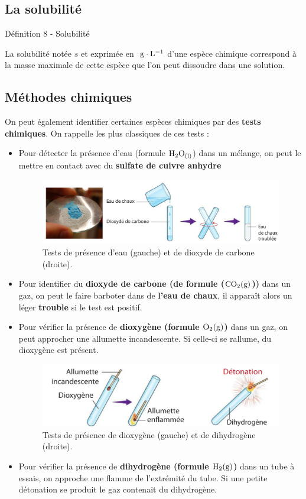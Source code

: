 \documentclass[french, a4paper, 12pt, twocolumn, landscape]{article}
\begin{document}
\subsection{La solubilité}

\begin{definition}{Définition 8 - Solubilité}
	\medskip

	La solubilité notée $s$ et exprimée en $~\rm g\cdot L^{-1}$ d'une espèce chimique correspond à la masse maximale de cette espèce que l'on peut dissoudre dans une solution.
\end{definition}
\clearpage


		\subsection{Méthodes chimiques}


		On peut également identifier certaines espèces chimiques par des \textbf{tests chimiques}. On rappelle les plus classiques de ces tests :

		\begin{itemize}
			\item Pour détecter la présence d'eau (formule $\rm H_2O_{(l)}$) dans un mélange, on peut le mettre en contact avec du \textbf{sulfate de cuivre anhydre}
			\begin{figure}[ht]
				\centering
				\includegraphics[width=.5\textwidth]{sulfatedecuivre.png}
				\caption{Tests de présence d’eau (gauche) et de dioxyde de carbone (droite).}
			\end{figure}
			\item Pour identifier du \textbf{dioxyde de carbone (de formule ($\rm CO_2(\rm g)$))} dans un gaz, on peut le faire barboter dans de \textbf{l'eau de chaux}, il apparaît alors un léger \textbf{trouble} si le test est positif.
			\item Pour vérifier la présence de \textbf{dioxygène (formule $\rm O_2(g)$)} dans un gaz, on peut approcher une allumette incandescente. Si celle-ci se rallume, du dioxygène est présent.
			\begin{figure}[ht]
				\centering
				\includegraphics[width=.35\textwidth]{dihydrogène.png}
				\caption{Tests de présence de dioxygène (gauche) et de dihydrogène (droite).}
			\end{figure}

			\item Pour vérifier la présence de \textbf{dihydrogène (formule $\rm H_2(g)$)} dans un tube à essais, on approche une flamme de l'extrémité du tube. Si une petite détonation se produit le gaz contenait du dihydrogène.
		\end{itemize}
\end{document}
